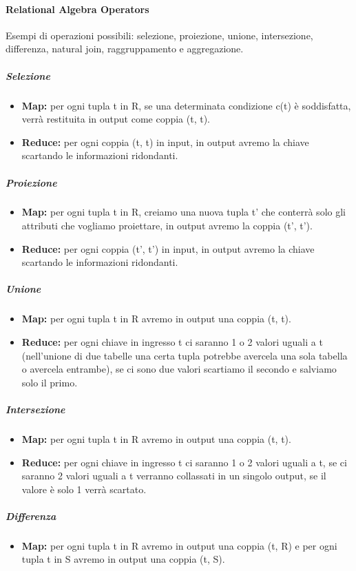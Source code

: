 \documentclass{article}
\begin{document}
\begin{appendices}
\paragraph{Relational Algebra Operators}
Esempi di operazioni possibili: selezione, proiezione, unione, intersezione, differenza, natural join, raggruppamento e aggregazione.
\subparagraph{Selezione}
\begin{itemize}
    \item \textbf{Map:} per ogni tupla t in R, se una determinata condizione c(t) è soddisfatta, verrà restituita in output come coppia (t, t).
    \item \textbf{Reduce:} per ogni coppia (t, t) in input, in output avremo la chiave scartando le informazioni ridondanti.  
\end{itemize}
\subparagraph{Proiezione}
\begin{itemize}
    \item \textbf{Map:} per ogni tupla t in R, creiamo una nuova tupla t' che conterrà solo gli attributi che vogliamo proiettare, in output avremo la coppia (t', t').
    \item \textbf{Reduce:} per ogni coppia (t', t') in input, in output avremo la chiave scartando le informazioni ridondanti.  
\end{itemize}
\subparagraph{Unione}
\begin{itemize}
    \item \textbf{Map:} per ogni tupla t in R avremo in output una coppia (t, t).
    \item \textbf{Reduce:} per ogni chiave in ingresso t ci saranno 1 o 2 valori uguali a t (nell'unione di due tabelle una certa tupla potrebbe avercela una sola tabella o avercela entrambe), se ci sono due valori scartiamo il secondo e salviamo solo il primo.  
\end{itemize}
\subparagraph{Intersezione}
\begin{itemize}
    \item \textbf{Map:} per ogni tupla t in R avremo in output una coppia (t, t).
    \item \textbf{Reduce:} per ogni chiave in ingresso t ci saranno 1 o 2 valori uguali a t, se ci saranno 2 valori uguali a t verranno collassati in un singolo output, se il valore è solo 1 verrà scartato.  
\end{itemize}
\subparagraph{Differenza}
\begin{itemize}
    \item \textbf{Map:} per ogni tupla t in R avremo in output una coppia (t, R) e per ogni tupla t in S avremo in output una coppia (t, S).

\end{itemize}
\end{appendices}
\end{document}
